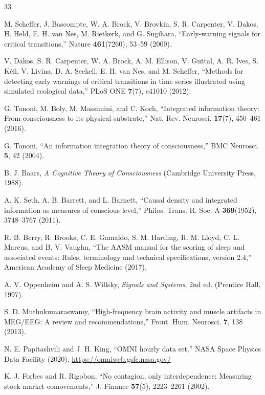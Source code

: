 \documentclass[aip,cha,reprint,amsmath,amssymb,final]{revtex4-2}
\begin{document}
\begin{thebibliography}{33}

 M. Scheffer, J. Bascompte, W. A. Brock, V. Brovkin, S. R. Carpenter, V. Dakos, H. Held, E. H. van Nes, M. Rietkerk, and G. Sugihara, ``Early-warning signals for critical transitions,'' Nature \textbf{461}(7260), 53--59 (2009).

 V. Dakos, S. R. Carpenter, W. A. Brock, A. M. Ellison, V. Guttal, A. R. Ives, S. K{\'e}fi, V. Livina, D. A. Seekell, E. H. van Nes, and M. Scheffer, ``Methods for detecting early warnings of critical transitions in time series illustrated using simulated ecological data,'' PLoS ONE \textbf{7}(7), e41010 (2012).

 G. Tononi, M. Boly, M. Massimini, and C. Koch, ``Integrated information theory: From consciousness to its physical substrate,'' Nat. Rev. Neurosci. \textbf{17}(7), 450--461 (2016).

 G. Tononi, ``An information integration theory of consciousness,'' BMC Neurosci. \textbf{5}, 42 (2004).

 B. J. Baars, \emph{A Cognitive Theory of Consciousness} (Cambridge University Press, 1988).

 A. K. Seth, A. B. Barrett, and L. Barnett, ``Causal density and integrated information as measures of conscious level,'' Philos. Trans. R. Soc. A \textbf{369}(1952), 3748--3767 (2011).

 R. B. Berry, R. Brooks, C. E. Gamaldo, S. M. Harding, R. M. Lloyd, C. L. Marcus, and B. V. Vaughn, ``The AASM manual for the scoring of sleep and associated events: Rules, terminology and technical specifications, version 2.4,'' American Academy of Sleep Medicine (2017).

 A. V. Oppenheim and A. S. Willsky, \emph{Signals and Systems}, 2nd ed. (Prentice Hall, 1997).

 S. D. Muthukumaraswamy, ``High-frequency brain activity and muscle artifacts in MEG/EEG: A review and recommendations,'' Front. Hum. Neurosci. \textbf{7}, 138 (2013).

 N. E. Papitashvili and J. H. King, ``OMNI hourly data set,'' NASA Space Physics Data Facility (2020). \url{https://omniweb.gsfc.nasa.gov/}

 K. J. Forbes and R. Rigobon, ``No contagion, only interdependence: Measuring stock market comovements,'' J. Finance \textbf{57}(5), 2223--2261 (2002).


\end{thebibliography}
\end{document}
